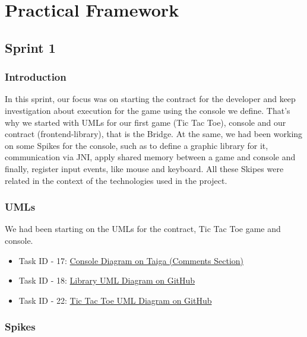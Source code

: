 \section{Practical Framework}


\subsection{Sprint 1}

\subsubsection{Introduction}

In this sprint, our focus was on starting the contract for the developer and 
keep investigation about execution for the game using the console we define.
That's why we started with UMLs for our first game (Tic Tac Toe), console and
our contract (frontend-library), that is the Bridge.
At the same, we had been working on some Spikes for the console, such as to
define a graphic library for it, communication via JNI, apply shared memory 
between a game and console and finally, register input events, like mouse and keyboard.
All these Skipes were related in the context of the technologies used in the project.

\subsubsection{UMLs}

We had been starting on the UMLs for the contract, Tic Tac Toe game and console.

\begin{itemize}
    \item Task ID - 17: \href{https://tree.taiga.io/project/joseluis-teran-coffeetime/us/17?milestone=392128}{Console Diagram on Taiga (Comments Section)}
    \item Task ID - 18: \href{https://github.com/Pending-Name-21/arquitecture/pull/2}{Library UML Diagram on GitHub}
    \item Task ID - 22: \href{https://github.com/Pending-Name-21/arquitecture/pull/3}{Tic Tac Toe UML Diagram on GitHub}
\end{itemize}

\subsubsection{Spikes}

